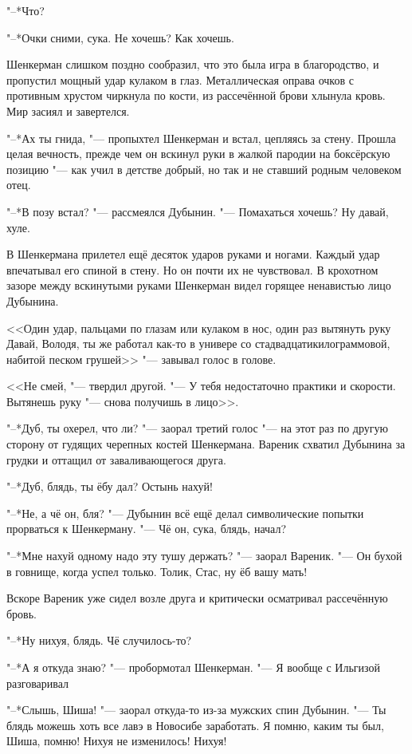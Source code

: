 "--*Что?

"--*Очки сними, сука.
Не хочешь?
Как хочешь.

Шенкерман слишком поздно сообразил, что это была игра в благородство, и пропустил мощный удар кулаком в глаз.
Металлическая оправа очков с противным хрустом чиркнула по кости, из рассечённой брови хлынула кровь.
Мир засиял и завертелся.

"--*Ах ты гнида, "--- пропыхтел Шенкерман и встал, цепляясь за стену.
Прошла целая вечность, прежде чем он вскинул руки в жалкой пародии на боксёрскую позицию "--- как учил в детстве добрый, но так и не ставший родным человеком отец.

"--*В позу встал? "--- рассмеялся Дубынин.
"--- Помахаться хочешь?
Ну давай, хуле.

В Шенкермана прилетел ещё десяток ударов руками и ногами.
Каждый удар впечатывал его спиной в стену.
Но он почти их не чувствовал.
В крохотном зазоре между вскинутыми руками Шенкерман видел горящее ненавистью лицо Дубынина.

<<Один удар, пальцами по глазам или кулаком в нос, один раз вытянуть руку\ldotst
Давай, Володя, ты же работал как-то в универе со стадвадцатикилограммовой, набитой песком грушей\ldotse >> "--- завывал голос в голове.

<<Не смей, "--- твердил другой.
"--- У тебя недостаточно практики и скорости.
Вытянешь руку "--- снова получишь в лицо>>.

"--*Дуб, ты охерел, что ли? "--- заорал третий голос "--- на этот раз по другую сторону от гудящих черепных костей Шенкермана.
Вареник схватил Дубынина за грудки и оттащил от заваливающегося друга.

"--*Дуб, блядь, ты ёбу дал?
Остынь нахуй!

"--*Не, а чё он, бля? "--- Дубынин всё ещё делал символические попытки прорваться к Шенкерману.
"--- Чё он, сука, блядь, начал?

"--*Мне нахуй одному надо эту тушу держать? "--- заорал Вареник.
"--- Он бухой в говнище, когда успел только.
Толик, Стас, ну ёб вашу мать!

Вскоре Вареник уже сидел возле друга и критически осматривал рассечённую бровь.

"--*Ну нихуя, блядь.
Чё случилось-то?

"--*А я откуда знаю? "--- пробормотал Шенкерман.
"--- Я вообще с Ильгизой разговаривал\ldotst

"--*Слышь, Шиша! "--- заорал откуда-то из-за мужских спин Дубынин.
"--- Ты блядь можешь хоть все лавэ в Новосибе заработать.
Я помню, каким ты был, Шиша, помню!
Нихуя не изменилось!
Нихуя!

